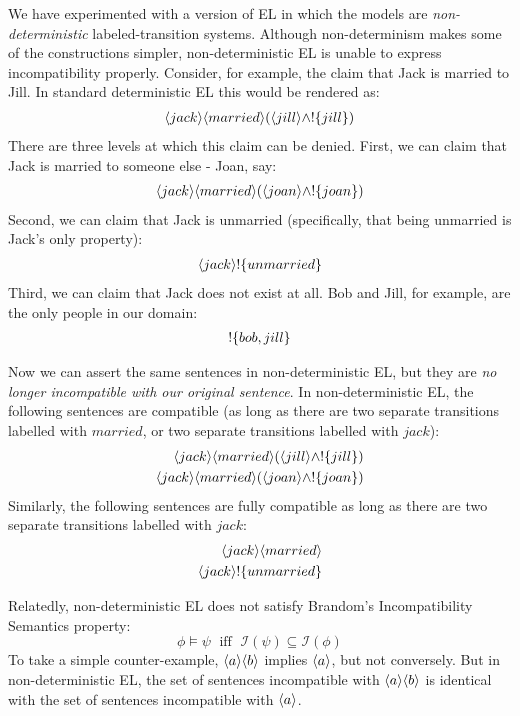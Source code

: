 We have experimented with a version of EL in which the models are
\emph{non-deterministic} labeled-transition systems.  Although
non-determinism makes some of the constructions simpler,
non-deterministic EL is unable to express incompatibility properly.
Consider, for example, the claim that Jack is married to Jill. 
In standard deterministic EL this would be rendered as:
\begin{eqnarray*}
\langle jack \rangle \langle married \rangle (\langle jill \rangle \land ! \{jill\})
\end{eqnarray*}
There are three levels at which this claim can be denied.
First, we can claim that Jack is married to someone else - Joan, say:
\begin{eqnarray*}
\langle jack \rangle \langle married \rangle (\langle joan \rangle \land ! \{joan\})
\end{eqnarray*}
Second, we can claim that Jack is unmarried (specifically, that being unmarried is Jack's only property):
\begin{eqnarray*}
\langle jack \rangle !\{unmarried\}
\end{eqnarray*}
Third, we can claim that Jack does not exist at all. Bob and Jill, for example, are the only people in our domain:
\begin{eqnarray*}
! \{bob, jill\}
\end{eqnarray*}

Now we can assert the same sentences in non-deterministic EL, but they
are \emph{no longer incompatible with our original sentence}.  In
non-deterministic EL, the following sentences are compatible (as long
as there are two separate transitions labelled with $married$, or two
separate transitions labelled with $jack$):
\begin{eqnarray*}
\langle jack \rangle \langle married \rangle (\langle jill \rangle \land ! \{jill\}) \\
\langle jack \rangle \langle married \rangle (\langle joan \rangle \land ! \{joan\})
\end{eqnarray*}
Similarly, the following sentences are fully compatible as long as there are two separate transitions labelled with $jack$:
\begin{eqnarray*}
\langle jack \rangle \langle married \rangle \\
\langle jack \rangle ! \{unmarried\}
\end{eqnarray*}

Relatedly, non-deterministic EL does not satisfy Brandom's Incompatibility Semantics property:
\[
\phi \models \psi \; \mbox{ iff } \; \mathcal{I}(\psi) \subseteq \mathcal{I}(\phi)
\]
To take a simple counter-example, $\MAY{a}\MAY{b}$ implies $\MAY{a}$, but not conversely.
But in non-deterministic EL, the set of sentences incompatible with $\MAY{a}\MAY{b}$ is identical with the set of sentences incompatible with  $\MAY{a}$.




